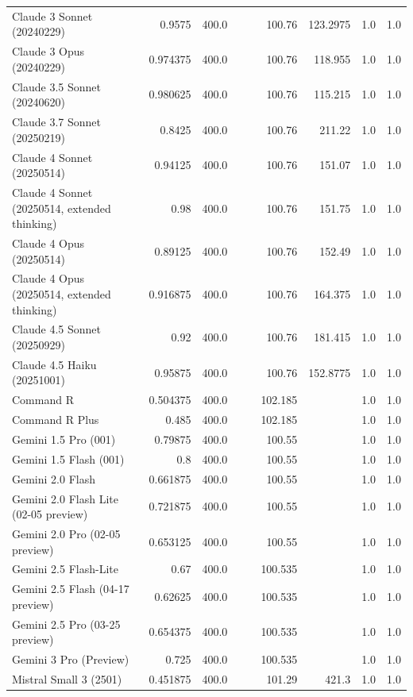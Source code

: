 \begin{table}[htp]
{\begin{tabular}{lrrrrrrrr}
Claude 3 Sonnet (20240229) & 0.9575 & 400.0 &  &  & 100.76 & 123.2975 & 1.0 & 1.0 \\
Claude 3 Opus (20240229) & 0.974375 & 400.0 &  &  & 100.76 & 118.955 & 1.0 & 1.0 \\
Claude 3.5 Sonnet (20240620) & 0.980625 & 400.0 &  &  & 100.76 & 115.215 & 1.0 & 1.0 \\
Claude 3.7 Sonnet (20250219) & 0.8425 & 400.0 &  &  & 100.76 & 211.22 & 1.0 & 1.0 \\
Claude 4 Sonnet (20250514) & 0.94125 & 400.0 &  &  & 100.76 & 151.07 & 1.0 & 1.0 \\
Claude 4 Sonnet (20250514, extended thinking) & 0.98 & 400.0 &  &  & 100.76 & 151.75 & 1.0 & 1.0 \\
Claude 4 Opus (20250514) & 0.89125 & 400.0 &  &  & 100.76 & 152.49 & 1.0 & 1.0 \\
Claude 4 Opus (20250514, extended thinking) & 0.916875 & 400.0 &  &  & 100.76 & 164.375 & 1.0 & 1.0 \\
Claude 4.5 Sonnet (20250929) & 0.92 & 400.0 &  &  & 100.76 & 181.415 & 1.0 & 1.0 \\
Claude 4.5 Haiku (20251001) & 0.95875 & 400.0 &  &  & 100.76 & 152.8775 & 1.0 & 1.0 \\
Command R & 0.504375 & 400.0 &  &  & 102.185 &  & 1.0 & 1.0 \\
Command R Plus & 0.485 & 400.0 &  &  & 102.185 &  & 1.0 & 1.0 \\
Gemini 1.5 Pro (001) & 0.79875 & 400.0 &  &  & 100.55 &  & 1.0 & 1.0 \\
Gemini 1.5 Flash (001) & 0.8 & 400.0 &  &  & 100.55 &  & 1.0 & 1.0 \\
Gemini 2.0 Flash & 0.661875 & 400.0 &  &  & 100.55 &  & 1.0 & 1.0 \\
Gemini 2.0 Flash Lite (02-05 preview) & 0.721875 & 400.0 &  &  & 100.55 &  & 1.0 & 1.0 \\
Gemini 2.0 Pro (02-05 preview) & 0.653125 & 400.0 &  &  & 100.55 &  & 1.0 & 1.0 \\
Gemini 2.5 Flash-Lite & 0.67 & 400.0 &  &  & 100.535 &  & 1.0 & 1.0 \\
Gemini 2.5 Flash (04-17 preview) & 0.62625 & 400.0 &  &  & 100.535 &  & 1.0 & 1.0 \\
Gemini 2.5 Pro (03-25 preview) & 0.654375 & 400.0 &  &  & 100.535 &  & 1.0 & 1.0 \\
Gemini 3 Pro (Preview) & 0.725 & 400.0 &  &  & 100.535 &  & 1.0 & 1.0 \\
Mistral Small 3 (2501) & 0.451875 & 400.0 &  &  & 101.29 & 421.3 & 1.0 & 1.0 \\

\end{tabular}}
\end{table}
